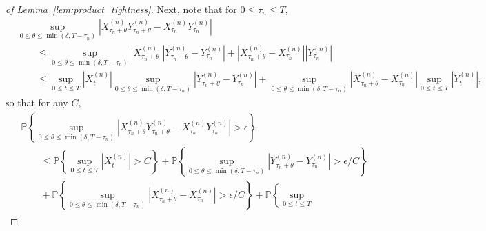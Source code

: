 \documentclass[EJP]{ejpecp} %
\newcommand{\IP}{\mathbb P}
\begin{document}
\begin{proof}[of Lemma~\ref{lem:product_tightness}]
    Next, note that for $0 \le \tau_n \le T$,
    \begin{align*}
        &
        \sup_{0 \le \theta \le \min(\delta, T-\tau_n)} 
        \left|
            X^{(n)}_{\tau_n + \theta} Y^{(n)}_{\tau_n + \theta} 
            -
            X^{(n)}_{\tau_n} Y^{(n)}_{\tau_n} 
        \right|
        \\ &\qquad 
        \le
        \sup_{0 \le \theta \le \min(\delta, T-\tau_n)} 
        \left| X^{(n)}_{\tau_n + \theta} \right|
        \left|
            Y^{(n)}_{\tau_n + \theta} 
            -
            Y^{(n)}_{\tau_n} 
        \right|
        +
        \left|
            X^{(n)}_{\tau_n + \theta}
            -
            X^{(n)}_{\tau_n}
        \right|
        \left| Y^{(n)}_{\tau_n} \right|
        \\ &\qquad 
        \le
        \sup_{0 \le t \le T}
            \left| X^{(n)}_t \right|
        \sup_{0 \le \theta \le \min(\delta, T-\tau_n)} 
        \left|
            Y^{(n)}_{\tau_n + \theta} 
            -
            Y^{(n)}_{\tau_n} 
        \right|
        +
        \sup_{0 \le \theta \le \min(\delta, T-\tau_n)} 
        \left|
            X^{(n)}_{\tau_n + \theta}
            -
            X^{(n)}_{\tau_n}
        \right|
        \sup_{0 \le t \le T}
        \left| Y^{(n)}_t \right| ,
    \end{align*}
    so that for any $C$,
    \begin{align} \label{eqn:xy_bound}
        \begin{split}
        &
        \IP\left\{
        \sup_{0 \le \theta \le \min(\delta, T-\tau_n)} 
        \left|
            X^{(n)}_{\tau_n + \theta} Y^{(n)}_{\tau_n + \theta} 
            -
            X^{(n)}_{\tau_n} Y^{(n)}_{\tau_n} 
        \right|
        > \epsilon
        \right\}
    \\ &\qquad \le
        \IP\left\{
            \sup_{0 \le t \le T}
                \left| X^{(n)}_t \right|
            > C
        \right\}
    +
        \IP\left\{
        \sup_{0 \le \theta \le \min(\delta, T-\tau_n)} 
        \left|
            Y^{(n)}_{\tau_n + \theta} 
            -
            Y^{(n)}_{\tau_n} 
        \right|
            > \epsilon/C
        \right\}
    \\ &\qquad {} +
        \IP\left\{
        \sup_{0 \le \theta \le \min(\delta, T-\tau_n)} 
        \left|
            X^{(n)}_{\tau_n + \theta} 
            -
            X^{(n)}_{\tau_n} 
        \right|
            > \epsilon/C
        \right\}
    +
        \IP\left\{
            \sup_{0 \le t \le T}

\end{split}
\end{align}
\end{proof}
\end{document}
